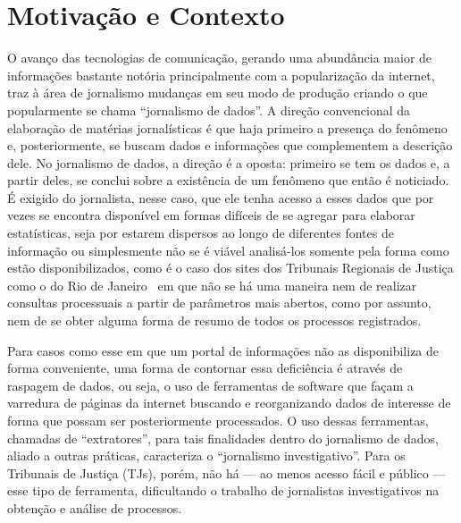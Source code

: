 \section{Motivação e Contexto~\label{sec:Motivação-e-Contexto}}


O avanço das tecnologias de comunicação, gerando uma abundância maior de
informações bastante notória principalmente com a popularização da internet,
traz à área de jornalismo mudanças em seu modo de produção criando o que
popularmente se chama ``jornalismo de dados''. A direção convencional da
elaboração de matérias jornalísticas é que haja primeiro a presença do fenômeno
e, posteriormente, se buscam dados e informações que complementem a descrição
dele. No jornalismo de dados, a direção é a oposta: primeiro se tem os dados e,
a partir deles, se conclui sobre a existência de um fenômeno que então é
noticiado. %
É exigido do jornalista, nesse caso, que ele tenha acesso a esses
dados que por vezes se encontra disponível em formas difíceis de se agregar
para elaborar estatísticas, seja por estarem dispersos ao longo de diferentes
fontes de informação ou simplesmente não se é viável analisá-los somente pela
forma como estão disponibilizados, como é o caso dos sites dos Tribunais
Regionais de Justiça como o do Rio de Janeiro~\cite{tjrj} em que não se há uma
maneira nem de realizar consultas processuais a partir de parâmetros mais
abertos, como por assunto, nem de se obter alguma forma de resumo de todos os
processos registrados.

Para casos como esse em que um portal de informações não as disponibiliza de
forma conveniente, uma forma de contornar essa deficiência é através de
raspagem de dados, ou seja, o uso de ferramentas de software que façam a
varredura de páginas da internet buscando e reorganizando dados de interesse de
forma que possam ser posteriormente processados. O uso dessas ferramentas,
chamadas de ``extratores'', para tais finalidades dentro do jornalismo de
dados, aliado a outras práticas, caracteriza o ``jornalismo investigativo''.
Para os Tribunais de Justiça (TJs), porém, não há --- ao menos acesso fácil e
público --- esse tipo de ferramenta, dificultando o trabalho de jornalistas
investigativos na obtenção e análise de processos.
